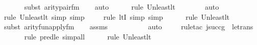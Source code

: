 \begin{isabellebody}
\ \ \ \ \ \isamarkupfalse%
{\isacharparenleft}{\kern0pt}subst\ arity{\isacharunderscore}{\kern0pt}pair{\isacharunderscore}{\kern0pt}fm{\isacharparenright}{\kern0pt}\isanewline
\ \ \isamarkupfalse%
\ auto{\isacharbrackleft}{\kern0pt}{}{\isacharbrackright}{\kern0pt}\isanewline
\ \ \ \ \ \isamarkupfalse%
{\isacharparenleft}{\kern0pt}rule\ Un{\isacharunderscore}{\kern0pt}least{\isacharunderscore}{\kern0pt}lt{\isacharparenright}{\kern0pt}{\isacharplus}{\kern0pt}\isanewline
\ \ \ \ \ \ \isamarkupfalse%
\ auto{\isacharbrackleft}{\kern0pt}{}{\isacharbrackright}{\kern0pt}\isanewline
\ \ \ \ \ \isamarkupfalse%
{\isacharparenleft}{\kern0pt}rule\ Un{\isacharunderscore}{\kern0pt}least{\isacharunderscore}{\kern0pt}lt{\isacharcomma}{\kern0pt}\ simp{\isacharcomma}{\kern0pt}\ simp{\isacharparenright}{\kern0pt}\isanewline
\ \ \ \ \isamarkupfalse%
{\isacharparenleft}{\kern0pt}rule\ ltI{\isacharcomma}{\kern0pt}\ simp{\isacharcomma}{\kern0pt}\ simp{\isacharparenright}{\kern0pt}\isanewline
\ \ \ \ \ \isamarkupfalse%
{\isacharparenleft}{\kern0pt}rule\ Un{\isacharunderscore}{\kern0pt}least{\isacharunderscore}{\kern0pt}lt{\isacharparenright}{\kern0pt}{\isacharplus}{\kern0pt}\isanewline
\ \ \ \ \ \isamarkupfalse%
{\isacharparenleft}{\kern0pt}subst\ arity{\isacharunderscore}{\kern0pt}fun{\isacharunderscore}{\kern0pt}apply{\isacharunderscore}{\kern0pt}fm{\isacharparenright}{\kern0pt}\isanewline
\ \ \isamarkupfalse%
\ assms\ \isanewline
\ \ \ \ \ \ \ \ \isamarkupfalse%
\ auto{\isacharbrackleft}{\kern0pt}{}{\isacharbrackright}{\kern0pt}\isanewline
\ \ \ \ \isamarkupfalse%
{\isacharparenleft}{\kern0pt}rule{\isacharunderscore}{\kern0pt}tac\ j{\isacharequal}{\kern0pt}{\isachardoublequoteopen}succ{\isacharparenleft}{\kern0pt}g{\isacharparenright}{\kern0pt}{\isachardoublequoteclose}\ \ le{\isacharunderscore}{\kern0pt}trans{\isacharparenright}{\kern0pt}\isanewline
\ \ \ \ \ \isamarkupfalse%
{\isacharparenleft}{\kern0pt}rule\ pred{\isacharunderscore}{\kern0pt}le{\isacharcomma}{\kern0pt}\ simp{\isacharunderscore}{\kern0pt}all{\isacharparenright}{\kern0pt}{\isacharplus}{\kern0pt}\isanewline
\ \ \ \ \ \isamarkupfalse%
{\isacharparenleft}{\kern0pt}rule\ Un{\isacharunderscore}{\kern0pt}least{\isacharunderscore}{\kern0pt}lt{\isacharparenright}{\kern0pt}{\isacharplus}{\kern0pt}\isanewline
\ \ \ \ \ \ \ \isamarkupfalse%

\end{isabellebody}
